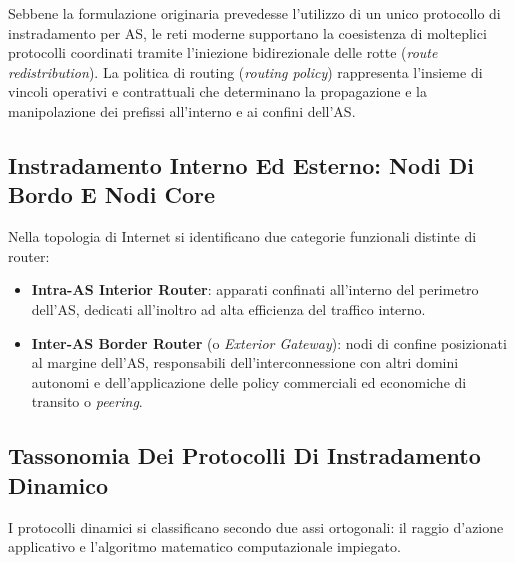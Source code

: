 \documentclass[11pt, a4paper]{article}
\begin{document}

Sebbene la formulazione originaria prevedesse l'utilizzo di un unico protocollo di instradamento per AS, le reti moderne supportano la coesistenza di molteplici protocolli coordinati tramite l'iniezione bidirezionale delle rotte (\emph{route redistribution}). La politica di routing (\emph{routing policy}) rappresenta l'insieme di vincoli operativi e contrattuali che determinano la propagazione e la manipolazione dei prefissi all'interno e ai confini dell'AS.

\subsection{Instradamento Interno Ed Esterno: Nodi Di Bordo E Nodi Core}

Nella topologia di Internet si identificano due categorie funzionali distinte di router:


\begin{itemize}
    \item \textbf{Intra-AS Interior Router}: apparati confinati all'interno del perimetro dell'AS, dedicati all'inoltro ad alta efficienza del traffico interno.
    \item \textbf{Inter-AS Border Router} (o \emph{Exterior Gateway}): nodi di confine posizionati al margine dell'AS, responsabili dell'interconnessione con altri domini autonomi e dell'applicazione delle policy commerciali ed economiche di transito o \emph{peering}.
\end{itemize}

\subsection{Tassonomia Dei Protocolli Di Instradamento Dinamico}

I protocolli dinamici si classificano secondo due assi ortogonali: il raggio d'azione applicativo e l'algoritmo matematico computazionale impiegato.

\end{document}
